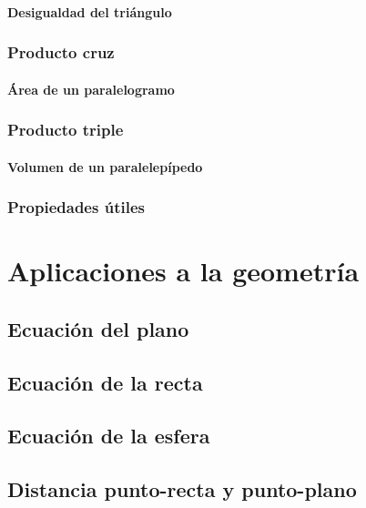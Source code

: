 \documentclass[12pt, fleqn]{report}                             %
\begin{document}
                \subsubsection{Desigualdad del triángulo}
            
            \subsection{Producto cruz}
            
                \subsubsection{Área de un paralelogramo}
            
            \subsection{Producto triple}
            
                \subsubsection{Volumen de un paralelepípedo}
                
            \subsection{Propiedades útiles}
            
    \chapter{Aplicaciones a la geometría}
        
        \section{Ecuación del plano}
            
        \section{Ecuación de la recta}
        
        \section{Ecuación de la esfera}
            
        \section{Distancia punto-recta y punto-plano}
        
\end{document}
